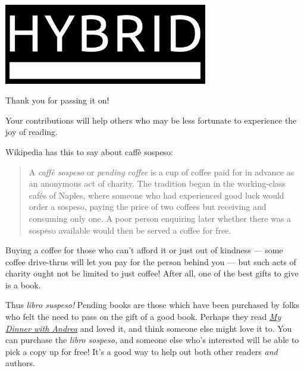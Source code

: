 \documentclass[12pt,letterpaper]{article}
\begin{document}
\thispagestyle{empty}

\begin{center}
\noindent\includegraphics[width=3.5in]{logo}

  \vspace{1cm}

{\huge Thank you for passing it on!}
\end{center}

\noindent Your contributions will help others who may be less fortunate to experience the joy of reading.

Wikipedia has this to say about caff\`{e} sospeso:

\begin{quote}
  A \emph{caff\`{e} sospeso} or \emph{pending coffee} is a cup of coffee paid for in advance as an anonymous act of charity. The tradition began in the working-class cafés of Naples, where someone who had experienced good luck would order a sospeso, paying the price of two coffees but receiving and consuming only one. A poor person enquiring later whether there was a sospeso available would then be served a coffee for free.
\end{quote}

Buying a coffee for those who can't afford it or just out of kindness --- some coffee drive-thrus will let you pay for the person behind you --- but such acts of charity ought not be limited to just coffee! After all, one of the best gifts to give is a book.

Thus \emph{libro suspeso!} Pending books are those which have been purchased by folks who felt the need to pass on the gift of a good book. Perhaps they read \emph{\href{https://hybrid.ink/my-dinner-with-andrea/}{My Dinner with Andrea}} and loved it, and think someone else might love it to. You can purchase the \emph{libro sospeso,} and someone else who's interested will be able to pick a copy up for free! It's a good way to help out both other readers \emph{and} authors.
\end{document}
